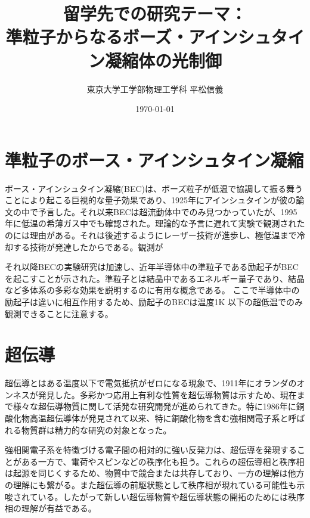\documentclass[11pt,a4paper]{jsarticle}
\title{留学先での研究テーマ：\\準粒子からなるボーズ・アインシュタイン凝縮体の光制御}
\author{東京大学工学部物理工学科 平松信義}
\date{\today}
\begin{document}
\maketitle
\thispagestyle{mypagestyle}

\section{準粒子のボース・アインシュタイン凝縮}
ボース・アインシュタイン凝縮(BEC)は、ボーズ粒子が低温で協調して振る舞うことにより起こる巨視的な量子効果であり、1925年にアインシュタインが彼の論文の中で予言した。それ以来BECは超流動体中でのみ見つかっていたが、1995年に低温の希薄ガス中でも確認された\cite{Davis,Anderson}。理論的な予言に遅れて実験で観測されたのには理由がある。それは後述するようにレーザー技術が進歩し、極低温まで冷却する技術が発達したからである。観測が


それ以降BECの実験研究は加速し、近年半導体中の準粒子である励起子がBECを起こすことが示された\cite{Yoshioka}。準粒子とは結晶中であるエネルギー量子であり、結晶など多体系の多彩な効果を説明するのに有用な概念である。
ここで半導体中の励起子は違いに相互作用するため、励起子のBECは温度1K 以下の超低温でのみ観測できることに注意する。

\section{超伝導}
超伝導とはある温度以下で電気抵抗がゼロになる現象で、1911年にオランダのオンネスが発見した。多彩かつ応用上有利な性質を超伝導物質は示すため、現在まで様々な超伝導物質に関して活発な研究開発が進められてきた。特に1986年に銅酸化物高温超伝導体が発見されて以来、特に銅酸化物を含む強相関電子系と呼ばれる物質群は精力的な研究の対象となった。

強相関電子系を特徴づける電子間の相対的に強い反発力は、超伝導を発現することがある一方で、電荷やスピンなどの秩序化も担う。これらの超伝導相と秩序相は起源を同じくするため、物質中で競合または共存\cite{Fausti,2D_SC}しており、一方の理解は他方の理解にも繋がる。また超伝導の前駆状態として秩序相が現れている可能性も示唆されている\cite{Valla1914}。したがって新しい超伝導物質や超伝導状態の開拓のためには秩序相の理解が有益である。
\end{document}
